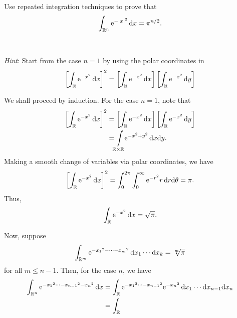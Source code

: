 \begin{problem}
  Use repeated integration techniques to prove that
  \[
    \int_{\mathbb{R}^n} \mathrm{e}^{-|x|^2}\mathop{}\!\mathrm{d} x=\pi^{n/2}.
  \]
  \\\\
  \emph{Hint}: Start from the case \(n=1\) by using the polar coordinates
  in
  \[
    \left[\int_{\bbR} \rme^{-x^2}\diff x\right]^2=%
    \left[\int_{\bbR} \rme^{-x^2}\diff x\right]%
    \left[\int_{\bbR} \rme^{-x^2}\diff y\right]%
  \]
\end{problem}
\begin{solution}
  We shall proceed by induction. For the case \(n=1\), note that
  \begin{align*}
    \left[\int_{\bbR} \rme^{-x^2}\diff x\right]^2
    &=\left[\int_{\bbR} \rme^{-x^2}\diff x\right]%
      \left[\int_{\bbR} \rme^{-x^2}\diff y\right]\\
    &=\int\limsclap{\bbR\times\bbR}\rme^{-x^2+y^2}\diff x\rmd y.
  \end{align*}
  Making a smooth change of variables via polar coordinates, we have
  \[
    \left[\int_{\mathbb{R}} \mathrm{e}^{-x^2}\mathop{}\!\mathrm{d} x\right]^2
    =\int_0^{2\pi}\int_0^\infty\mathrm{e}^{-r^2}r\mathop{}\!\mathrm{d} r\mathrm{d}\theta=\pi.
  \]
  Thus,
  \[
    \int_{\mathbb{R}}\mathrm{e}^{-x^2}\mathop{}\!\mathrm{d} x=\sqrt{\pi}.
  \]

  Now, suppose
  \[
    \int_{\bbR^m}\rme^{\cramped{-{x_1}^2-\dotsb-{x_m}^2}}\diff
    x_1\dotsm\rmd x_k=\sqrt[m]{\pi}
  \]
  for all \(m\leq n-1\). Then, for the case \(n\), we have
  \begin{align*}
    \int_{\bbR^n}\rme^{\cramped{-{x_1}^2\dotsb-{x_{n-1}}^2-{x_n}^2}}\diff x
    &=\int_\bbR\rme^{\cramped{-{x_1}^2\dotsb-{x_{n-1}}^2}}\rme^{\cramped{-{x_n}^2}}\diff
      x_1\dotsm\rmd x_{n-1}\rmd x_n\\
    &=\int_\bbR
  \end{align*}
\end{solution}

